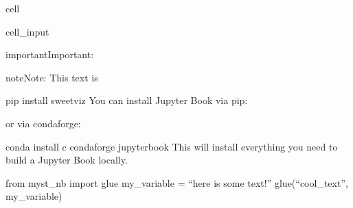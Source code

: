 \documentclass[letterpaper,10pt,english]{jupyterBook}
\begin{document}
\begin{sphinxuseclass}{cell}\begin{sphinxVerbatimInput}

\begin{sphinxuseclass}{cell_input}
\begin{sphinxVerbatim}[commandchars=\\\{\}]
  
  
  
\end{sphinxVerbatim}

\end{sphinxuseclass}\end{sphinxVerbatimInput}

\end{sphinxuseclass}
\begin{sphinxadmonition}{important}{Important:}
\begin{sphinxadmonition}{note}{Note:}
\sphinxAtStartPar
This text is  
\end{sphinxadmonition}
\end{sphinxadmonition}

\sphinxAtStartPar
pip install sweetviz
You can install Jupyter Book via pip:

\begin{sphinxVerbatim}[commandchars=\\\{\}]
   
\end{sphinxVerbatim}

\sphinxAtStartPar
or via conda\sphinxhyphen{}forge:

\sphinxAtStartPar
conda install \sphinxhyphen{}c conda\sphinxhyphen{}forge jupyter\sphinxhyphen{}book
This will install everything you need to build a Jupyter Book locally.

\sphinxAtStartPar
from myst\_nb import glue
my\_variable = “here is some text!”
glue(“cool\_text”, my\_variable)

\begin{sphinxVerbatim}[commandchars=\\\{\}]
  
\end{sphinxVerbatim}
\end{document}

